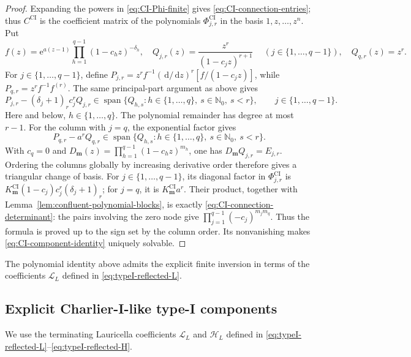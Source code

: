 \documentclass[10pt]{amsart}
\newcommand{\Nzero}{\mathbb N_0}
\newcommand{\e}{\mathrm e}
\newcommand{\dd}{\,\mathrm d}
\newcommand{\mm}{\boldsymbol m}
\theoremstyle{plain}
\theoremstyle{definition}
\theoremstyle{remark}
\begin{document}
\begin{proof}
Expanding the powers in \eqref{eq:CI-Phi-finite} gives
\eqref{eq:CI-connection-entries}; thus \(C^{\mathrm{CI}}\) is the
coefficient matrix of the polynomials \(\Phi_{j,r}^{\mathrm{CI}}\) in
the basis \(1,z,\ldots,z^n\).
Put
\[
 f(z)=\e^{a(z-1)}\prod_{h=1}^{q-1}(1-c_hz)^{-\delta_h},
 \quad Q_{j,r}(z)=\frac{z^r}{(1-c_jz)^{r+1}}\
 \quad(j\in\{1,\ldots,q-1\}),
 \quad Q_{q,r}(z)=z^r.
\]
For \(j\in\{1,\ldots,q-1\}\), define
\(P_{j,r}=z^rf^{-1}(\dd/\dd z)^r[f/(1-c_jz)]\), while
\(P_{q,r}=z^rf^{-1}f^{(r)}\). The same principal-part argument as above
gives
\[
 P_{j,r}-(\delta_j+1)_rc_j^rQ_{j,r}
 \in\operatorname{span}\{Q_{h,s}:h\in\{1,\ldots,q\},\
 s\in\Nzero,\ s<r\},
 \qquad j\in\{1,\ldots,q-1\}.
\]
Here and below, \(h\in\{1,\ldots,q\}\). The polynomial
remainder has degree at most \(r-1\). For the column with \(j=q\), the exponential
factor gives
\[
 P_{q,r}-a^rQ_{q,r}
 \in\operatorname{span}\{Q_{h,s}:h\in\{1,\ldots,q\},\
 s\in\Nzero,\ s<r\}.
\]
With \(c_q=0\) and
\(D_{\mm}(z)=\prod_{h=1}^{q-1}(1-c_hz)^{m_h}\), one has
\(D_{\mm}Q_{j,r}=E_{j,r}\). Ordering the columns globally by increasing
derivative order therefore gives a triangular change of basis. For
\(j\in\{1,\ldots,q-1\}\), its diagonal factor in
\(\Phi_{j,r}^{\mathrm{CI}}\) is
\(K_{\mm}^{\mathrm{CI}}(1-c_j)c_j^r(\delta_j+1)_r\); for \(j=q\), it is
\(K_{\mm}^{\mathrm{CI}}a^r\). Their product, together with
Lemma~\ref{lem:confluent-polynomial-blocks}, is exactly
\eqref{eq:CI-connection-determinant}: the pairs involving the zero node
give \(\prod_{j=1}^{q-1}(-c_j)^{m_jm_q}\). Thus the formula is proved up to
the sign set by the column order. Its nonvanishing makes
\eqref{eq:CI-component-identity} uniquely solvable.
\end{proof}

The polynomial identity above admits the explicit finite inversion in terms
of the coefficients \(\mathscr L_L\) defined in
\eqref{eq:typeI-reflected-L}.


\subsection{Explicit Charlier-I-like type-I components}
We use the terminating Lauricella coefficients \(\mathscr L_L\) and
\(\mathscr H_L\) defined in
\eqref{eq:typeI-reflected-L}--\eqref{eq:typeI-reflected-H}.
\end{document}
